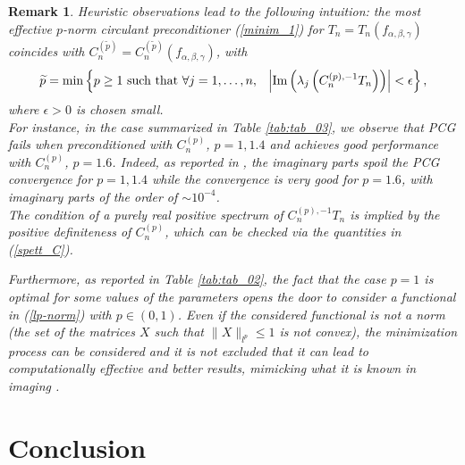 \documentclass{article}
\newtheorem{remark}[theorem]{Remark}
\begin{document}
\begin{remark}
	Heuristic observations lead to the following intuition: the most effective $ p $-norm circulant preconditioner (\ref{minim_1}) for
	$T_n= T_{ n } \left( f_{ \alpha, \beta, \gamma } \right)  $ coincides with $ C_{ n }^{ \left( \widetilde{ p } \right) }=C_{ n }^{ \left( \widetilde{ p } \right) }  \left( f_{ \alpha, \beta, \gamma } \right)$, with
	\begin{equation*}
		\widetilde{ p } = \min \left\lbrace p \geq 1 \text{ such that } \forall j = 1, \dots, n,\  \>\> \abs{ \Im \left( \lambda_{ j } \left( C_{ n }^{ \left( p \right), -1 } T_{ n } \right) \right) } < \epsilon \right\rbrace,
	\end{equation*}
	where $ \epsilon > 0 $ is chosen small. \\
	For instance, in the case summarized in  Table \ref{tab:tab_03}, we observe that PCG fails when preconditioned with $ C_{ n }^{ \left( p \right) } $, $ p = 1, 1.4 $ and achieves good performance with $ C_{ n }^{ \left( p \right) } $, $ p = 1.6 $. Indeed, as reported in \cite{beyond}, the imaginary parts spoil the PCG convergence for $ p = 1, 1.4 $ while the convergence is very good for $p=1.6$, with imaginary parts of the order of $ \sim 10^{ - 4 } $. \\
	The condition of a purely real positive spectrum of $ C_{ n }^{ \left( p \right), -1 } T_{ n } $ is implied by the positive definiteness of $ C_{ n }^{ \left( p \right) } $, which can be checked via the quantities in (\ref{spett_C}).
	
Furthermore, as reported in  Table \ref{tab:tab_02}, the fact that the case $p=1$ is optimal for some values of the parameters opens the door to consider a functional in (\ref{lp-norm}) with $p\in (0,1)$. Even if the considered functional is not a norm (the set of the matrices $X$ such that $\|X\|_{ l^{ p } }\le 1$ is not convex), the minimization process can be considered and it is not excluded that it can lead to computationally effective and better results, mimicking what it is known in imaging \cite{imag1,imag2}.
\end{remark}




\section{Conclusion}\label{sec:Conclusion}
\end{document}
